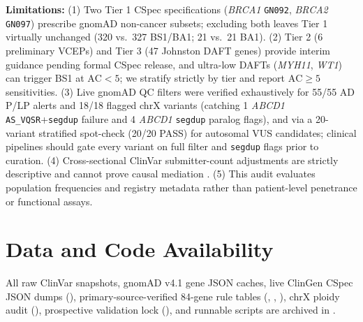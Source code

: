 \documentclass[11pt,letterpaper]{article}
\begin{document}
\textbf{Limitations:} (1) Two Tier 1 CSpec specifications (\textit{BRCA1} \texttt{GN092}, \textit{BRCA2} \texttt{GN097}) prescribe gnomAD non-cancer subsets; excluding both leaves Tier 1 virtually unchanged (320 vs.\ 327 BS1/BA1; 21 vs.\ 21 BA1). (2) Tier 2 (6 preliminary VCEPs) and Tier 3 (47 Johnston DAFT genes) provide interim guidance pending formal CSpec release, and ultra-low DAFTs (\textit{MYH11}, \textit{WT1}) can trigger BS1 at $\mathrm{AC}<5$; we stratify strictly by tier and report $\mathrm{AC}\ge 5$ sensitivities. (3) Live gnomAD QC filters were verified exhaustively for 55/55 AD P/LP alerts and 18/18 flagged chrX variants (catching 1 \textit{ABCD1} \texttt{AS\_VQSR}+\texttt{segdup} failure and 4 \textit{ABCD1} \texttt{segdup} paralog flags), and via a 20-variant stratified spot-check (20/20 PASS) for autosomal VUS candidates; clinical pipelines should gate every variant on full filter and \texttt{segdup} flags prior to curation. (4) Cross-sectional ClinVar submitter-count adjustments are strictly descriptive and cannot prove causal mediation \citep{imai2010mediation}. (5) This audit evaluates population frequencies and registry metadata rather than patient-level penetrance or functional assays.

\section*{Data and Code Availability}
{\sloppy
All raw ClinVar snapshots, gnomAD v4.1 gene JSON caches, live ClinGen CSpec JSON dumps (), primary-source-verified 84-gene rule tables (, , ), chrX ploidy audit (), prospective validation lock (), and runnable scripts are archived in .\par}



\end{document}
